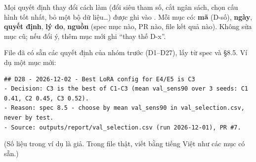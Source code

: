 Mọi quyết định thay đổi cách làm (đổi siêu tham số, cắt ngân sách, chọn cấu hình tốt nhất, bỏ một bộ dữ liệu\ldots)
được ghi vào . Mỗi mục có: \textbf{mã} (D-số), \textbf{ngày}, \textbf{quyết định}, \textbf{lý do}, \textbf{nguồn}
(spec mục nào, PR nào, file kết quả nào). Không sửa mục cũ; nếu đổi ý, thêm mục mới ghi ``thay thế D-x''.

File đã có sẵn các quyết định của nhóm trước (D1--D27), lấy từ spec và §8.5. Ví dụ một mục mới:

\begin{lstlisting}
## D28 - 2026-12-02 - Best LoRA config for E4/E5 is C3
- Decision: C3 is the best of C1-C3 (mean val_sens90 over 3 seeds: C1 0.41, C2 0.45, C3 0.52).
- Reason: spec 8.5 - choose by mean val_sens90 in val_selection.csv, never by test.
- Source: outputs/report/val_selection.csv (run 2026-12-01), PR #7.
\end{lstlisting}
(Số liệu trong ví dụ là giả. Trong file thật, viết bằng tiếng Việt như các mục có sẵn.)
